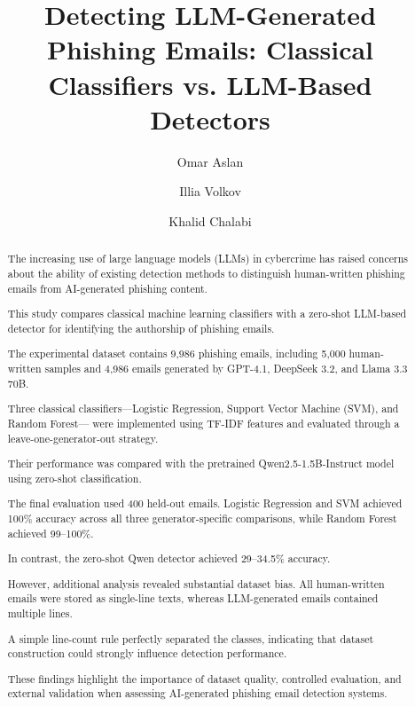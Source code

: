 \documentclass[sigconf,nonacm]{acmart}
\begin{document}
\title{Detecting LLM-Generated Phishing Emails:
Classical Classifiers vs. LLM-Based Detectors}


\author{Omar Aslan}

\author{Illia Volkov}

\author{Khalid Chalabi}


\begin{abstract}

The increasing use of large language models (LLMs)
in cybercrime has raised concerns about the ability
of existing detection methods to distinguish
human-written phishing emails from AI-generated
phishing content.

This study compares classical machine learning
classifiers with a zero-shot LLM-based detector
for identifying the authorship of phishing emails.

The experimental dataset contains 9,986 phishing
emails, including 5,000 human-written samples and
4,986 emails generated by GPT-4.1, DeepSeek 3.2,
and Llama 3.3 70B.

Three classical classifiers---Logistic Regression,
Support Vector Machine (SVM), and Random Forest---
were implemented using TF-IDF features and evaluated
through a leave-one-generator-out strategy.

Their performance was compared with the pretrained
Qwen2.5-1.5B-Instruct model using zero-shot
classification.

The final evaluation used 400 held-out emails.
Logistic Regression and SVM achieved 100\% accuracy
across all three generator-specific comparisons,
while Random Forest achieved 99--100\%.

In contrast, the zero-shot Qwen detector achieved
29--34.5\% accuracy.

However, additional analysis revealed substantial
dataset bias. All human-written emails were stored
as single-line texts, whereas LLM-generated emails
contained multiple lines.

A simple line-count rule perfectly separated the
classes, indicating that dataset construction could
strongly influence detection performance.

These findings highlight the importance of dataset
quality, controlled evaluation, and external
validation when assessing AI-generated phishing
email detection systems.

\end{abstract}
\end{document}
